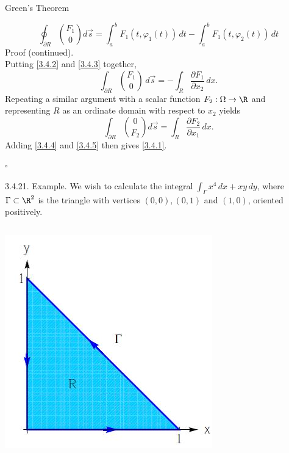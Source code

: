 \documentclass[smaller,hyperref={CJKbookmarks=true}]{beamer}
\begin{document}
\begin{frame}{Green's Theorem}
\begin{spacing}{1.05}
\begin{equation}
\oint_{\partial R}\binom{F_1}{0}d\vec{s}=\int_{a}^{b}F_1(t,\varphi_1(t))\,dt
-\int_{a}^{b}F_1(t,\varphi_2(t))\,dt
\end{equation}
\newpage
\vspace*{14pt}
\alert{Proof (continued).}\\
Putting \eqref{3.4.2} and \eqref{3.4.3} together,
\begin{equation}\label{3.4.4}
  \int_{\partial R}\binom{F_1}{0}\,d\vec{s}=-\int_R\frac{\partial F_1}{\partial x_2}\,dx.
\end{equation}
Repeating a similar argument with a scalar function $F_2:\Omega\to\R$ and representing $R$ as an ordinate domain with respect to $x_2$ yields
\begin{equation}\label{3.4.5}
  \int_{\partial R}\binom{0}{F_2}d\vec{s}=\int_R\frac{\partial F_2}{\partial x_1}\,dx.
\end{equation}
Adding \eqref{3.4.4} and \eqref{3.4.5} then gives \eqref{3.4.1}.
\begin{flushright}
  $\square$
\end{flushright}
\newpage
\alert{3.4.21. Example.} We wish to calculate the integral $\int_\Gamma x^4\,dx+xy\,dy$, where $\Gamma\subset\R^2$ is the triangle with vertices $(0,0),(0,1)$ and $(1,0)$, oriented positively.
\begin{columns}[onlytextwidth]
\begin{column}{0.3\textwidth}
\includegraphics[width=\columnwidth]{93.jpg}

\end{column}
\end{columns}
\end{spacing}
\end{frame}
\end{document}
